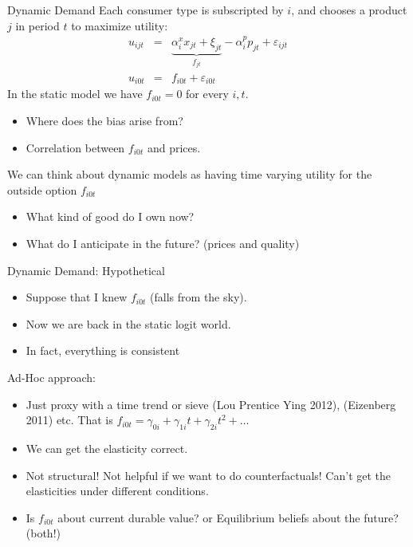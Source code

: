 \begin{frame}{Dynamic Demand}
Each consumer type is subscripted by $i$, and chooses a product $j$ in period $t$ to maximize utility:
\begin{eqnarray*}
u_{ijt} &=&   \underbrace{\alpha_i^x x_{jt} +  \xi_{jt}}_{f_{jt}} - \alpha_{i}^p p_{jt} + \varepsilon_{ijt} \\
 u_{i0t} &=&  f_{i0t} + \varepsilon_{i0t} 
\end{eqnarray*}
In the static model we have $f_{i0t} = 0$ for every $i,t$.\\
\begin{itemize}
\item Where does the bias arise from?
\item Correlation between $f_{i0t}$ and prices.
\end{itemize}
\vspace{0.5cm}
We can think about dynamic models as having time varying utility for the outside option $f_{i0t}$
\begin{itemize}
\item What kind of good do I own now?
\item What do I anticipate in the future? (prices and quality)
\end{itemize}
\end{frame}

\begin{frame}{Dynamic Demand: Hypothetical}
\begin{itemize}
\item Suppose that I knew $f_{i0t}$ (falls from the sky).
\item Now we are back in the static logit world.
\item In fact, everything is consistent
\end{itemize}
\alert{Ad-Hoc approach:}
\begin{itemize}
\item  Just proxy with a time trend or sieve (Lou Prentice Ying 2012), (Eizenberg 2011) etc.  That is $f_{i0t} = \gamma_{0i} + \gamma_{1i} t + \gamma_{2i} t^2 + \ldots$
\item We can get the elasticity correct.
\item Not structural! Not helpful if we want to do counterfactuals! Can't get the elasticities under different conditions.
\item Is $f_{i0t}$ about current durable value? or Equilibrium beliefs about the future? (both!)
\end{itemize}
\end{frame}

